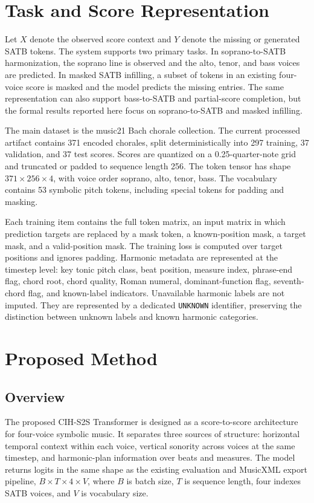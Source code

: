 \documentclass[11pt]{article}
\begin{document}
\section{Task and Score Representation}

Let $X$ denote the observed score context and $Y$ denote the missing or generated SATB tokens. The system supports two primary tasks. In soprano-to-SATB harmonization, the soprano line is observed and the alto, tenor, and bass voices are predicted. In masked SATB infilling, a subset of tokens in an existing four-voice score is masked and the model predicts the missing entries. The same representation can also support bass-to-SATB and partial-score completion, but the formal results reported here focus on soprano-to-SATB and masked infilling.

The main dataset is the music21 Bach chorale collection. The current processed artifact contains 371 encoded chorales, split deterministically into 297 training, 37 validation, and 37 test scores. Scores are quantized on a 0.25-quarter-note grid and truncated or padded to sequence length 256. The token tensor has shape $371 \times 256 \times 4$, with voice order soprano, alto, tenor, bass. The vocabulary contains 53 symbolic pitch tokens, including special tokens for padding and masking.

Each training item contains the full token matrix, an input matrix in which prediction targets are replaced by a mask token, a known-position mask, a target mask, and a valid-position mask. The training loss is computed over target positions and ignores padding. Harmonic metadata are represented at the timestep level: key tonic pitch class, beat position, measure index, phrase-end flag, chord root, chord quality, Roman numeral, dominant-function flag, seventh-chord flag, and known-label indicators. Unavailable harmonic labels are not imputed. They are represented by a dedicated \texttt{UNKNOWN} identifier, preserving the distinction between unknown labels and known harmonic categories.

\section{Proposed Method}

\subsection{Overview}

The proposed CIH-S2S Transformer is designed as a score-to-score architecture for four-voice symbolic music. It separates three sources of structure: horizontal temporal context within each voice, vertical sonority across voices at the same timestep, and harmonic-plan information over beats and measures. The model returns logits in the same shape as the existing evaluation and MusicXML export pipeline, $B \times T \times 4 \times V$, where $B$ is batch size, $T$ is sequence length, four indexes SATB voices, and $V$ is vocabulary size.
\end{document}
